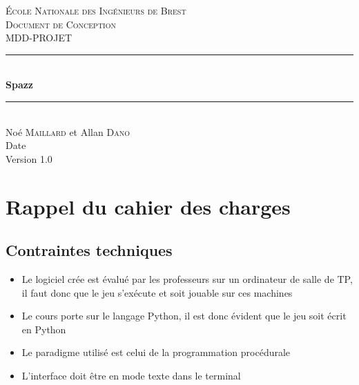 \documentclass[a4paper,11pt]{article}
\begin{document}
\begin{titlepage}

\newcommand{\HRule}{\rule{\linewidth}{0.5mm}} %

\center %
 

\textsc{\LARGE École Nationale des Ingénieurs de Brest}\\[1.5cm]
\textsc{\Large Document de Conception}\\[0.5cm]
\textsc{\large MDD-PROJET}\\[0.5cm]


\HRule \\[0.4cm]
{\huge \bfseries Spazz}\\[0.4cm] %
\HRule \\[1.5cm]
 
\Large
Noé \textsc{Maillard} et Allan \textsc{Dano}\\[3cm]


{Date}\\[3cm] %

{\large Version 1.0}
 

\vfill

\end{titlepage}

\tableofcontents
\newpage
\section{Rappel du cahier des charges}

\subsection{Contraintes techniques}

\begin{itemize}[label = $\bullet$]
	\item Le logiciel crée est évalué par les professeurs sur un ordinateur de salle de TP, il faut donc que le jeu s’exécute et soit jouable sur ces machines
	\item Le cours porte sur le langage Python, il est donc évident que le jeu soit écrit en Python
	\item Le paradigme utilisé est celui de la programmation procédurale
	\item L'interface doit être en mode texte dans le terminal
\end{itemize}
\end{document}
